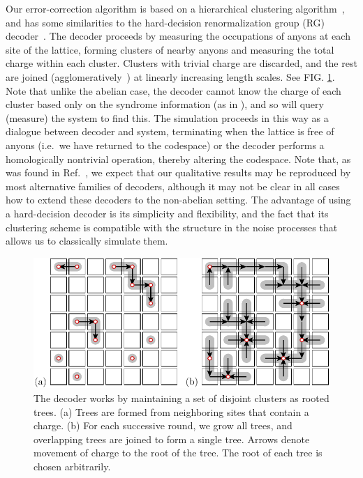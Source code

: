 \documentclass[aps, prl, letterpaper, twocolumn, superscriptaddress, notitlepage, 10pt]{revtex4-1}
\newcommand{\cggb}[1]{\textcolor{blue}{#1}}
\newcommand{\dude}[1]{\textcolor{red}{#1}}
\begin{document}
Our error-correction algorithm is
based on a hierarchical clustering algorithm~\cite{Hastie2009},
and has some 
similarities to the hard-decision renormalization group (RG) decoder~\cite{Bravyi2011}. 
The decoder proceeds by measuring the occupations of 
anyons at each site of the lattice, forming clusters of nearby anyons and 
measuring the total charge within each cluster.
Clusters with trivial charge are discarded, and
the rest are joined (agglomeratively~\cite{Hastie2009})
at linearly increasing length scales.
See FIG. \ref{f:decode}.
Note that unlike the abelian case, the decoder
cannot know the charge of each cluster based only
on the syndrome information (as in \cite{Bravyi2011}),
and so will query (measure) the system to find this.
The simulation proceeds in this way as a dialogue between decoder
and system, terminating when the lattice 
is free of anyons (i.e.~we have returned to the codespace) 
or the decoder performs a homologically nontrivial operation, thereby altering the codespace.
Note that, as was found in Ref.~\cite{Brell2013}, we expect that our qualitative results may be reproduced by most alternative families of decoders, although it may not be clear in all cases how to extend these decoders to the non-abelian setting.
The advantage of using a hard-decision decoder is 
its simplicity and flexibility, and the fact that its clustering scheme is compatible with the structure in the noise processes that allows us to classically simulate them.

\begin{figure}[t!]
\begin{center}
	\includegraphics[width=1.0\columnwidth]{pic-decode.pdf}
\caption{The decoder works by maintaining a set of disjoint clusters as rooted trees.
(a) Trees are formed from neighboring sites that contain a charge.
(b) For each successive round, we grow all trees, 
and overlapping trees are joined to form
a single tree. Arrows denote movement of charge to the root of the tree.
The root of each tree is chosen arbitrarily.
}
\label{f:decode}
\end{center}
\end{figure}
\end{document}
